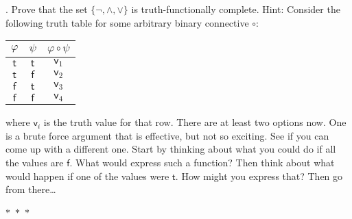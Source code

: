 \documentclass[12pt]{article}
\begin{document}
\newpage
{}. Prove that the set $\{\neg, \land, \lor\}$ is truth-functionally complete. Hint:
Consider the following truth table for some arbitrary binary connective $\circ$:
\medskip
\begin{center}
\begin{tabular}{cc|c}
$\varphi$ & $\psi$ & $\varphi \circ \psi$ \\ \hline
$\mathsf{t}$ & $\mathsf{t}$ & $\mathsf{v}_1$ \\
$\mathsf{t}$ & $\mathsf{f}$ & $\mathsf{v}_2$ \\
$\mathsf{f}$ & $\mathsf{t}$ & $\mathsf{v}_3$ \\
$\mathsf{f}$ & $\mathsf{f}$ & $\mathsf{v}_4$ \\
\end{tabular}
\end{center}
\medskip
\noindent
where $\mathsf{v}_i$ is the truth value for that row. There are at least two 
options now.  One is a brute force argument that is effective, but not so exciting.
See if you can come up with a different one. Start by thinking about what you could
do if all the values are $\mathsf{f}$. What would express such a function? Then 
think about what would happen if one of the values were $\mathsf{t}$. How might you
express that? Then go from there\dots
\begin{center}
    $\ast$~$\ast$~$\ast$
\end{center}
\end{document}
